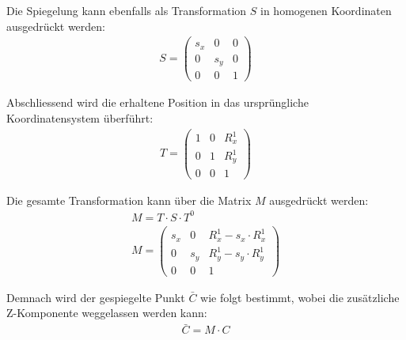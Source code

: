 Die Spiegelung kann ebenfalls als Transformation $S$ in homogenen Koordinaten ausgedrückt werden:
\begin{align}
    S = \begin{pmatrix}s_x & 0 & 0 \\ 0 & s_y & 0 \\ 0 & 0 & 1\end{pmatrix}
\end{align}

Abschliessend wird die erhaltene Position in das ursprüngliche Koordinatensystem überführt:
\begin{align}
    T = \begin{pmatrix}1 & 0 & R^1_x\\0 & 1 & R^1_y\\0 & 0 & 1\end{pmatrix}
\end{align}

Die gesamte Transformation kann über die Matrix $M$ ausgedrückt werden:
\begin{align}
    M = T \cdot S \cdot T^0\\
    M = \begin{pmatrix}s_x & 0 & R^1_x - s_x \cdot R^1_x \\ 0 & s_y & R^1_y - s_y \cdot R^1_y \\ 0 & 0 & 1\end{pmatrix}
\end{align}

Demnach wird der gespiegelte Punkt $\bar{C}$ wie folgt bestimmt, wobei die zusätzliche Z-Komponente weggelassen werden
kann:
\begin{align}
    \bar{C} = M \cdot C
\end{align}